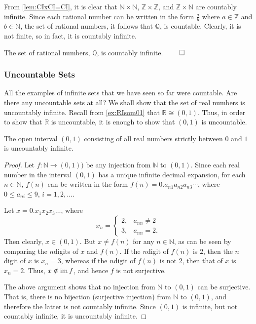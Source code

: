 From \cref{lem:CIxCI=CI}, it is clear that $\mathbb N \times \mathbb N$, $\mathbb Z \times \mathbb Z$, and $\mathbb Z \times \mathbb N$ are countably infinite. Since each rational number can be written in the form $\frac a b$ where $a \in \mathbb Z$ and $b \in \mathbb N$, the set of rational numbers, it follows that $\mathbb Q$, is countable. Clearly, it is not finite, so in fact, it is countably infinite. 

\begin{Theorem}
The set of rational numbers, $\mathbb Q$, is countably infinite. \hfill $\qed$
\end{Theorem}

\subsubsection{Uncountable Sets}\label{subsec:UncountableSets}
All the examples of infinite sets that we have seen so far were countable. Are there any uncountable sets at all? We shall show that the set of real numbers is uncountably infinite. Recall from \cref{ex:RIsom01} that $\mathbb R \cong (0, 1)$. Thus, in order to show that $\mathbb R$ is uncountable, it is enough to show that $(0, 1)$ is uncountable.

\begin{Theorem}
The open interval $(0, 1)$ consisting of all real numbers strictly between $0$ and $1$ is uncountably infinite.
\end{Theorem}

\begin{proof}
Let $f \colon \mathbb N \to (0, 1))$ be any injection from $\mathbb N$ to $(0, 1)$. Since each real number in the interval $(0, 1)$ has a unique infinite decimal expansion, for each $n \in \mathbb N$, $f(n)$ can be written in the form $f(n) = 0.a_{n1} a_{n2} a_{n3} \cdots$, where $0 \le a_{ni} \le 9$, $i = 1, 2, \ldots$.

Let $x = 0.x_1 x_2 x_3 \ldots$, where
\begin{equation*}
x_n = \begin{cases}
2, & a_{nn} \ne 2 \\
3, & a_{nn} = 2.
\end{cases}
\end{equation*}
Then clearly, $x \in (0, 1)$. But $x \ne f(n)$ for any $n \in \mathbb N$, as can be seen by comparing the $n$\nth digits of $x$ and $f(n)$. If the $n$\nth digit of $f(n)$ is $2$, then the $n$\nth digit of $x$ is $x_n = 3$, whereas if the $n$\nth digit of $f(n)$ is not $2$, then that of $x$ is $x_n = 2$. Thus, $x \notin \operatorname{im} f$, and hence $f$ is not surjective.

The above argument shows that no injection from $\mathbb N$ to $(0, 1)$ can be surjective. That is, there is no bijection (surjective injection) from $\mathbb N$ to $(0, 1)$, and therefore the latter is not countably infinite. Since $(0, 1)$ is infinite, but not countably infinite, it is uncountably infinite.
\end{proof}

